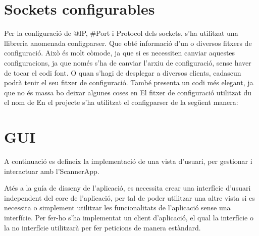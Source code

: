 \documentclass[letterpaper,11pt,catalan]{sphinxmanual}
\begin{document}
\section{Sockets configurables}
\label{\detokenize{index:sockets-configurables}}
Per la configuració de @IP, \#Port i Protocol dels sockets, s'ha utilitzat una llibreria anomenada configparser. Que obté informació d'un o diversos fitxers de configuració.
Això és molt còmode, ja que si es necessiten canviar aquestes configuracions, ja que només s'ha de canviar l'arxiu de configuració, sense haver de tocar el codi font. O
quan s'hagi de desplegar a diversos clients, cadascun podrà tenir el seu fitxer de configuració.
També presenta un codi més elegant, ja que no és massa bo deixar algunes coses en 
El fitxer de configuració utilitzat du el nom de 
En el projecte s'ha utilitzat el configparser de la següent manera:

\begin{sphinxVerbatim}[commandchars=\\\{\}]
 

  
   
  \PYG{p}{[}\PYG{p}{]}\PYG{p}{[}\PYG{p}{]}
  \PYG{p}{[}\PYG{p}{]}\PYG{p}{[}\PYG{p}{]}
\end{sphinxVerbatim}


\section{GUI}
\label{\detokenize{index:gui}}
A continuació es defineix la implementació de una vista d'usuari, per gestionar i interactuar
amb l'ScannerApp.

Atés a la guía de disseny de l'aplicació, es necessita crear una interfície d'usuari
independent del core de l'aplicació, per tal de poder utilitzar una altre vista si
es necessita o simplement utilitzar les funcionalitats de l'aplicació sense una interfície.
Per fer-ho s'ha implementat un client d'aplicació, el qual la interfície o la no
interfície utilitzarà per fer peticions de manera estàndard.
\end{document}
